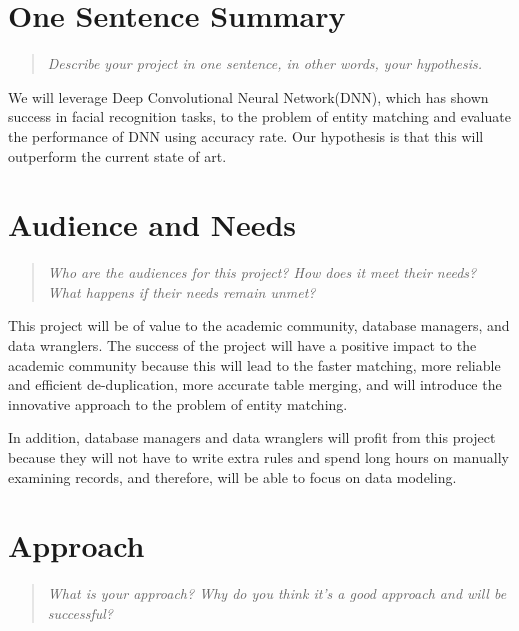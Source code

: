 \documentclass{proc}
\begin{document}
\section{One Sentence Summary}
\begin{quote}
\emph{Describe your project in one sentence, in other words, your hypothesis.}
\end{quote}

We will leverage Deep Convolutional Neural Network(DNN), which has shown success in facial recognition tasks, to the problem of entity matching and evaluate the performance of DNN using accuracy rate. Our hypothesis is that this will outperform the current state of art.

\section{Audience and Needs}
\begin{quote}
\emph{Who are the audiences for this project? 
How does it meet their needs? 
What happens if their needs remain unmet?}
\end{quote}

This project will be of value to the academic community, database managers, and data wranglers. The success of the project will have a positive impact to the academic community because this will lead to the faster matching, more reliable and efficient de-duplication, more accurate table merging, and will introduce the innovative approach to the problem of entity matching. 

In addition, database managers and data wranglers will profit from this project because they will not have to write extra rules and spend long hours on manually examining records, and therefore, will be able to focus on data modeling.

\section{Approach}
\begin{quote}
\emph{What is your approach?
Why do you think it's a good approach and will be successful?}
\end{quote}
\end{document}
